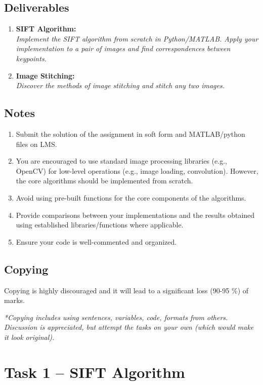 \documentclass[11pt,a4paper]{article}
\begin{document}
\subsection*{Deliverables}
\begin{enumerate}[leftmargin=*]
  \item \textbf{SIFT Algorithm:}
        \textit{\\Implement the SIFT algorithm from scratch in Python/MATLAB. Apply your implementation to a pair of images and find correspondences between keypoints.}

  \item \textbf{Image Stitching:}
        \textit{\\Discover the methods of image stitching and stitch any two images.}
\end{enumerate}

\subsection*{Notes}
\begin{enumerate}[label=(\alph*), leftmargin=*]
  \item Submit the solution of the assignment in soft form and MATLAB/python files on LMS.
  \item You are encouraged to use standard image processing libraries (e.g., OpenCV) for low-level operations (e.g., image loading, convolution). However, the core algorithms should be implemented from scratch.
  \item Avoid using pre-built functions for the core components of the algorithms.
  \item Provide comparisons between your implementations and the results obtained using established libraries/functions where applicable.
  \item Ensure your code is well-commented and organized.
\end{enumerate}

\subsection*{Copying}
Copying is highly discouraged and it will lead to a significant loss  (90-95 \%) of marks.

\textit{*Copying includes using sentences, variables, code, formats from others. Discussion is appreciated, but attempt the tasks on your own (which would make it look original).}

\newpage
\section{Task 1 -- SIFT Algorithm}
\end{document}

